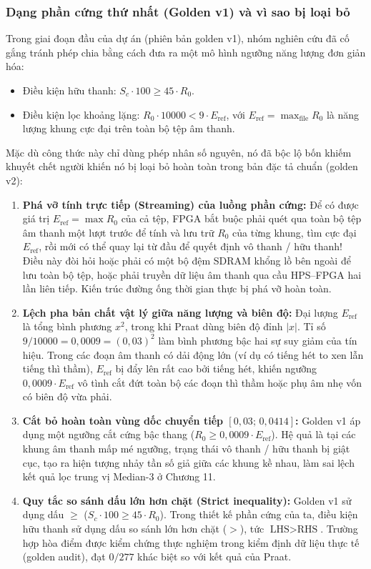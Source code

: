 \subsubsection*{Dạng phần cứng thứ nhất (Golden v1) và vì sao bị loại bỏ}
Trong giai đoạn đầu của dự án (phiên bản golden v1), nhóm nghiên cứu đã cố gắng tránh phép chia bằng cách đưa ra một mô hình ngưỡng năng lượng đơn giản hóa:
\begin{itemize}
    \item Điều kiện hữu thanh: $S_c \cdot 100 \ge 45 \cdot R_0$.
    \item Điều kiện lọc khoảng lặng: $R_0 \cdot 10000 < 9 \cdot E_{\text{ref}}$, với $E_{\text{ref}} = \max_{\text{file}} R_0$ là năng lượng khung cực đại trên toàn bộ tệp âm thanh.
\end{itemize}
Mặc dù công thức này chỉ dùng phép nhân số nguyên, nó đã bộc lộ bốn khiếm khuyết chết người khiến nó bị loại bỏ hoàn toàn trong bản đặc tả chuẩn (golden v2):
\begin{enumerate}
    \item \textbf{Phá vỡ tính trực tiếp (Streaming) của luồng phần cứng:} Để có được giá trị $E_{\text{ref}} = \max R_0$ của cả tệp, FPGA bắt buộc phải quét qua toàn bộ tệp âm thanh một lượt trước để tính và lưu trữ $R_0$ của từng khung, tìm cực đại $E_{\text{ref}}$, rồi mới có thể quay lại từ đầu để quyết định vô thanh / hữu thanh! Điều này đòi hỏi hoặc phải có một bộ đệm SDRAM khổng lồ bên ngoài để lưu toàn bộ tệp, hoặc phải truyền dữ liệu âm thanh qua cầu HPS--FPGA hai lần liên tiếp. Kiến trúc đường ống thời gian thực bị phá vỡ hoàn toàn.
    \item \textbf{Lệch pha bản chất vật lý giữa năng lượng và biên độ:} Đại lượng $E_{\text{ref}}$ là tổng bình phương $x^2$, trong khi Praat dùng biên độ đỉnh $|x|$. Tỉ số $9 / 10000 = 0{,}0009 = (0{,}03)^2$ làm bình phương bậc hai sự suy giảm của tín hiệu. Trong các đoạn âm thanh có dải động lớn (ví dụ có tiếng hét to xen lẫn tiếng thì thầm), $E_{\text{ref}}$ bị đẩy lên rất cao bởi tiếng hét, khiến ngưỡng $0{,}0009 \cdot E_{\text{ref}}$ vô tình cắt đứt toàn bộ các đoạn thì thầm hoặc phụ âm nhẹ vốn có biên độ vừa phải.
    \item \textbf{Cắt bỏ hoàn toàn vùng dốc chuyển tiếp $[0{,}03;\, 0{,}0414]$:} Golden v1 áp dụng một ngưỡng cắt cứng bậc thang ($R_0 \ge 0{,}0009 \cdot E_{\text{ref}}$). Hệ quả là tại các khung âm thanh mấp mé ngưỡng, trạng thái vô thanh / hữu thanh bị giật cục, tạo ra hiện tượng nhảy tần số giả giữa các khung kề nhau, làm sai lệch kết quả lọc trung vị Median-3 ở Chương 11.
    \item \textbf{Quy tắc so sánh dấu lớn hơn chặt (Strict inequality):} Golden v1 sử dụng dấu $\ge$ ($S_c \cdot 100 \ge 45 \cdot R_0$). Trong thiết kế phần cứng của ta, điều kiện hữu thanh sử dụng dấu so sánh lớn hơn chặt ($>$), tức $\text{LHS} > \text{RHS}$. Trường hợp hòa điểm được kiểm chứng thực nghiệm trong kiểm định dữ liệu thực tế (golden audit), đạt $0 / 277$ khác biệt so với kết quả của Praat.
\end{enumerate}

